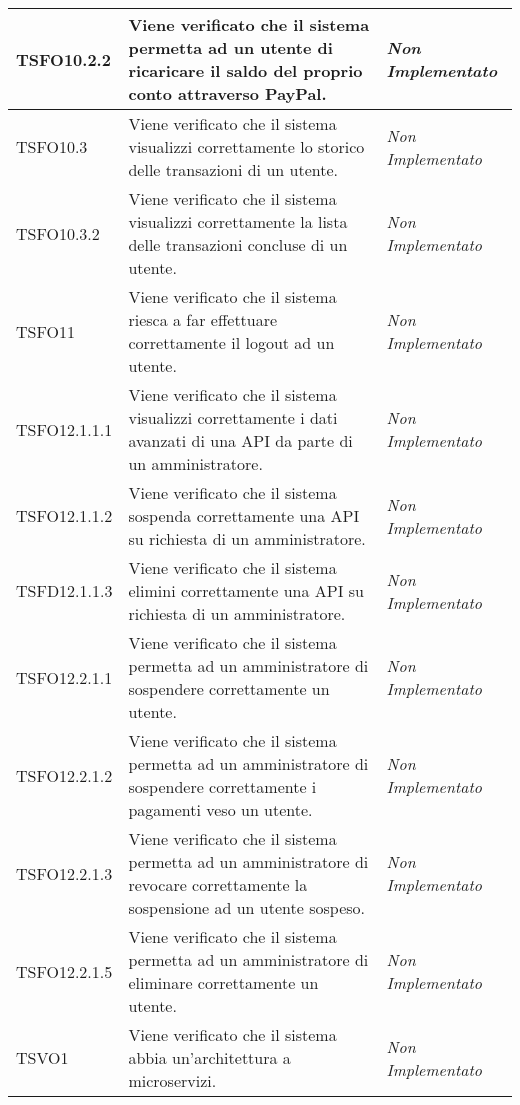 \begin{longtable}{|>{\centering\arraybackslash}p{2.3cm}|>{\centering\arraybackslash}p{7.5cm} | >{\centering\arraybackslash}p{3.8cm}|}
		\hypertarget{TSFO10.2.2}{TSFO10.2.2} & Viene verificato che il sistema permetta ad un utente di ricaricare il saldo del proprio conto attraverso PayPal. & \textit{Non Implementato}\\ \hline
		\hypertarget{TSFO10.3}{TSFO10.3} & Viene verificato che il sistema visualizzi correttamente lo storico delle transazioni di un utente. & \textit{Non Implementato}\\ \hline
		\hypertarget{TSFO10.3.2}{TSFO10.3.2} & Viene verificato che il sistema visualizzi correttamente la lista delle transazioni concluse di un utente. & \textit{Non Implementato}\\ \hline
		\hypertarget{TSFO11}{TSFO11} & Viene verificato che il sistema riesca a far effettuare correttamente il logout ad un utente.  & \textit{Non Implementato}\\ \hline
		\hypertarget{TSFO12.1.1.1}{TSFO12.1.1.1} & Viene verificato che il sistema visualizzi correttamente i dati avanzati di una API da parte di un amministratore. & \textit{Non Implementato}\\ \hline
		\hypertarget{TSFO12.1.1.2}{TSFO12.1.1.2} & Viene verificato che il sistema sospenda correttamente una API su richiesta di un amministratore. & \textit{Non Implementato}\\ \hline
		\hypertarget{TSFD12.1.1.3}{TSFD12.1.1.3} & Viene verificato che il sistema elimini correttamente una API su richiesta di un amministratore. & \textit{Non Implementato}\\ \hline
		\hypertarget{TSFO12.2.1.1}{TSFO12.2.1.1} & Viene verificato che il sistema permetta ad un amministratore di sospendere correttamente un utente. & \textit{Non Implementato}\\ \hline
		\hypertarget{TSFO12.2.1.2}{TSFO12.2.1.2} & Viene verificato che il sistema permetta ad un amministratore di sospendere correttamente i pagamenti veso un utente. & \textit{Non Implementato}\\ \hline
		\hypertarget{TSFO12.2.1.3}{TSFO12.2.1.3} & Viene verificato che il sistema permetta ad un amministratore di revocare correttamente la sospensione ad un utente sospeso. & \textit{Non Implementato}\\ \hline
		\hypertarget{TSFO12.2.1.5}{TSFO12.2.1.5} & Viene verificato che il sistema permetta ad un amministratore di eliminare correttamente un utente. & \textit{Non Implementato}\\ \hline		
		\hypertarget{TSVO1}{TSVO1} & Viene verificato che il sistema abbia un'architettura a microservizi. & \textit{Non Implementato}\\ \hline

\end{longtable}
